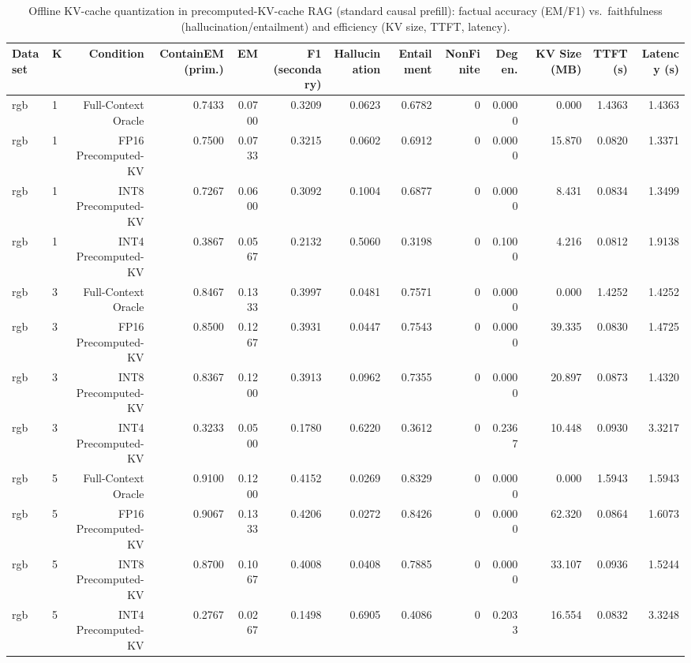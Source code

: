 \begin{table}[t]
\centering
\small
\begin{tabular}{llrrrrrrrrrrr}
\toprule
Dataset & K & Condition & ContainEM (prim.) & EM & F1 (secondary) & Hallucination & Entailment & NonFinite & Degen. & KV Size (MB) & TTFT (s) & Latency (s) \\
\midrule
rgb & 1 & Full-Context Oracle & 0.7433 & 0.0700 & 0.3209 & 0.0623 & 0.6782 & 0 & 0.0000 & 0.000 & 1.4363 & 1.4363 \\
rgb & 1 & FP16 Precomputed-KV & 0.7500 & 0.0733 & 0.3215 & 0.0602 & 0.6912 & 0 & 0.0000 & 15.870 & 0.0820 & 1.3371 \\
rgb & 1 & INT8 Precomputed-KV & 0.7267 & 0.0600 & 0.3092 & 0.1004 & 0.6877 & 0 & 0.0000 & 8.431 & 0.0834 & 1.3499 \\
rgb & 1 & INT4 Precomputed-KV & 0.3867 & 0.0567 & 0.2132 & 0.5060 & 0.3198 & 0 & 0.1000 & 4.216 & 0.0812 & 1.9138 \\
rgb & 3 & Full-Context Oracle & 0.8467 & 0.1333 & 0.3997 & 0.0481 & 0.7571 & 0 & 0.0000 & 0.000 & 1.4252 & 1.4252 \\
rgb & 3 & FP16 Precomputed-KV & 0.8500 & 0.1267 & 0.3931 & 0.0447 & 0.7543 & 0 & 0.0000 & 39.335 & 0.0830 & 1.4725 \\
rgb & 3 & INT8 Precomputed-KV & 0.8367 & 0.1200 & 0.3913 & 0.0962 & 0.7355 & 0 & 0.0000 & 20.897 & 0.0873 & 1.4320 \\
rgb & 3 & INT4 Precomputed-KV & 0.3233 & 0.0500 & 0.1780 & 0.6220 & 0.3612 & 0 & 0.2367 & 10.448 & 0.0930 & 3.3217 \\
rgb & 5 & Full-Context Oracle & 0.9100 & 0.1200 & 0.4152 & 0.0269 & 0.8329 & 0 & 0.0000 & 0.000 & 1.5943 & 1.5943 \\
rgb & 5 & FP16 Precomputed-KV & 0.9067 & 0.1333 & 0.4206 & 0.0272 & 0.8426 & 0 & 0.0000 & 62.320 & 0.0864 & 1.6073 \\
rgb & 5 & INT8 Precomputed-KV & 0.8700 & 0.1067 & 0.4008 & 0.0408 & 0.7885 & 0 & 0.0000 & 33.107 & 0.0936 & 1.5244 \\
rgb & 5 & INT4 Precomputed-KV & 0.2767 & 0.0267 & 0.1498 & 0.6905 & 0.4086 & 0 & 0.2033 & 16.554 & 0.0832 & 3.3248 \\
\bottomrule
\end{tabular}
\caption{Offline KV-cache quantization in precomputed-KV-cache RAG (standard causal prefill): factual accuracy (EM/F1) vs.\ faithfulness (hallucination/entailment) and efficiency (KV size, TTFT, latency).}
\label{tab:main}
\end{table}
